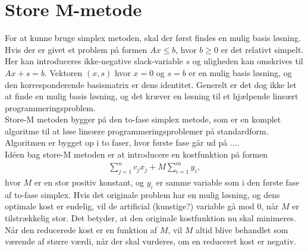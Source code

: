 \section{Store M-metode}

For at kunne bruge simplex metoden, skal der først findes en mulig basis løsning. 
Hvis der er givet et problem på formen $Ax \leq b$, hvor $b \geq 0$ er det relativt simpelt. 
Her kan introduceres ikke-negative slack-variable $s$ og uligheden kan omskrives til $Ax+s=b$. 
Vektoren $(x,s)$ hvor $x=0$ og $s=b$ er en mulig basis løsning, og den korresponderende basismatrix er dens identitet. 
Generelt er det dog ikke let at finde en mulig basis løsning, og det kræver en løsning til et hjælpende lineært programmeringsproblem. \\

Store-M metoden bygger på den to-fase simplex metode, som er en komplet algoritme til at løse lineære programmeringsproblemer på standardform. 
Algoritmen er bygget op i to faser, hvor første fase går ud på .... \\

Idéen bag store-M metoden er at introducere en kostfunktion på formen
\begin{align*}
\sum\limits_{j=1}^n c_jx_j + M \sum\limits_{i=1}^m y_i,
\end{align*}
hvor $M$ er en stor positiv konstant, og $y_i$ er samme variable som i den første fase af to-fase simplex. 
Hvis det originale problem har en mulig løsning, og dens optimale kost er endelig, vil de artificial (kunstige?) variable gå mod $0$, når $M$ er tilstrækkelig stor. 
Det betyder, at den originale kostfunktion nu skal minimeres. 
Når den reducerede kost er en funktion af $M$, vil $M$ altid blive behandlet som værende af større værdi, når der skal vurderes, om en reduceret kost er negativ. \\

